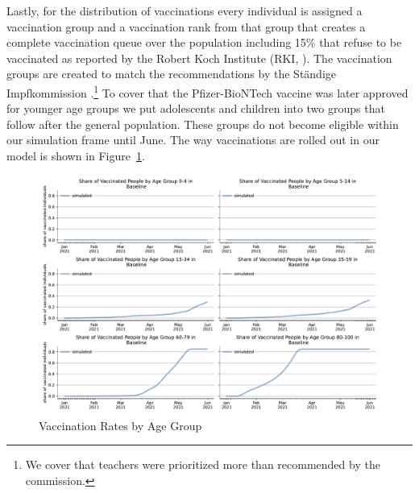 Lastly, for the distribution of vaccinations every individual is assigned a vaccination
group and a vaccination rank from that group that creates a complete vaccination queue
over the population including 15\% that refuse to be vaccinated as reported by the Robert
Koch Institute (RKI, \cite{RKI2021}). The vaccination groups are created to match the
recommendations by the Ständige Impfkommission \citep{VygenBonnet2020}.\footnote{We cover
that teachers were prioritized more than recommended by the commission.} To cover that
the Pfizer-BioNTech vaccine was later approved for younger age groups we put adolescents
and children into two groups that follow after the general population. These groups do
not become eligible within our simulation frame until June. The way vaccinations are rolled out in our model is shown in Figure~\ref{fig:vaccinations_by_age_group}.

\begin{figure}[ht]   %
  \centering
  \includegraphics[width=\textwidth]{figures/results/figures/vaccinations/spring_baseline}
  \caption{Vaccination Rates by Age Group}
  \label{fig:vaccinations_by_age_group}
\end{figure}


\FloatBarrier
